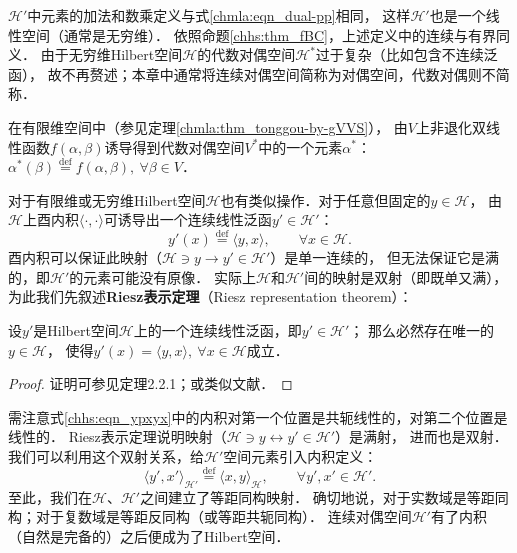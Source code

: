 $\mathcal{H}'$中元素的加法和数乘定义与式\eqref{chmla:eqn_dual-pp}相同，
这样$\mathcal{H}'$也是一个线性空间（通常是无穷维）．
依照命题\ref{chhs:thm_fBC}，上述定义中的{\kaishu 连续}与{\kaishu 有界}同义．
由于无穷维Hilbert空间$\mathcal{H}$的代数对偶空间$\mathcal{H}^*$过于复杂（比如包含不连续泛函），
故不再赘述；本章中通常将连续对偶空间简称为对偶空间，代数对偶则不简称．

在有限维空间中（参见定理\ref{chmla:thm_tonggou-by-gVVS}），
由$V$上非退化双线性函数$f(\alpha,\beta)$诱导得到代数对偶空间$V^{*}$中的一个元素$\alpha^*$：
$\alpha^{*}(\beta) \overset{\mathrm {def}}{=} f(\alpha,\beta),\ \forall \beta \in V$．

对于有限维或无穷维Hilbert空间$\mathcal{H}$也有类似操作．对于任意但固定的$y\in \mathcal{H}$，
由$\mathcal{H}$上酉内积$\langle\cdot,\cdot\rangle$可诱导出一个连续线性泛函$y' \in \mathcal{H}'$：
\begin{equation}\label{chhs:eqn_ypxyx}
	y'(x) \overset{\mathrm {def}}{=} \langle y, x \rangle,\qquad \forall x \in \mathcal{H} .
\end{equation}
酉内积可以保证此映射（$\mathcal{H} \ni y \to y' \in \mathcal{H}'$）是单一连续的，
但无法保证它是满的，即$\mathcal{H}'$的元素可能没有原像．
实际上$\mathcal{H}$和$\mathcal{H}'$间的映射是双射（即既单又满），
为此我们先叙述{\heiti \bfseries Riesz表示定理}（Riesz representation theorem）：


\begin{theorem}\label{chhs:thm_riesz-rep}
	设$y'$是Hilbert空间$\mathcal{H}$上的一个连续线性泛函，即$y'\in \mathcal{H}'$；
	那么必然存在唯一的$y \in \mathcal{H}$，
	使得$y'(x)=\langle y , x \rangle , \ \forall x \in \mathcal{H}$成立．
\end{theorem}
\begin{proof}
	证明可参见\parencite{zhang-lin-2021}定理2.2.1；或类似文献．
\end{proof}

需注意式\eqref{chhs:eqn_ypxyx}中的内积对第一个位置是共轭线性的，对第二个位置是线性的．
Riesz表示定理说明映射（$\mathcal{H} \ni y \longleftrightarrow y' \in \mathcal{H}'$）是满射，
进而也是双射．我们可以利用这个双射关系，给$\mathcal{H}'$空间元素引入内积定义：
\begin{equation}
	\langle y', x' \rangle_{\mathcal{H}'} \overset{\mathrm {def}}{=} \langle x , y \rangle_{\mathcal{H}} , 
	\qquad \forall y', x' \in \mathcal{H}' . 
\end{equation}
至此，我们在$\mathcal{H}$、$\mathcal{H}'$之间建立了等距同构映射．
确切地说，对于实数域是等距同构；对于复数域是等距反同构（或等距共轭同构）．
连续对偶空间$\mathcal{H}'$有了内积（自然是完备的）之后便成为了Hilbert空间．






